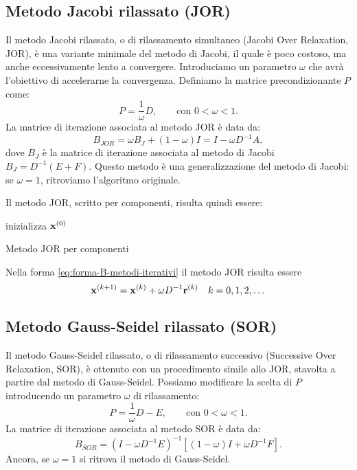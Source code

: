 \subsection{Metodo Jacobi rilassato (JOR)}
Il metodo Jacobi rilassato, o di rilassamento simultaneo (Jacobi Over Relaxation, JOR), è una variante minimale del metodo di Jacobi, il quale è poco costoso, ma anche eccessivamente lento a convergere.
Introduciamo un parametro $\omega$ che avrà l'obiettivo di accelerarne la convergenza. Definiamo la matrice precondizionante $P$ come:
\begin{equation*}
P=\frac{1}{\omega } D, \qquad \text{con } 0< \omega < 1.
\end{equation*}
La matrice di iterazione associata al metodo JOR è data da:
\begin{equation*}
B_{JOR} =\omega B_{J} +( 1-\omega ) I=I-\omega D^{-1} A,
\end{equation*}
dove %
$B_{J}$ è la matrice di iterazione associata al metodo di Jacobi $B_{J} =D^{-1}( E+F)$.
Questo metodo è una generalizzazione del metodo di Jacobi: se $\omega =1$, ritroviamo l'algoritmo originale.

Il metodo JOR, scritto per componenti, risulta quindi essere: \\
\begin{algo}
	inizializza $\mathbf{x}^{(0)}$\;
	\caption{Metodo JOR per componenti}
\end{algo}
Nella forma \eqref{eq:forma-B-metodi-iterativi} il metodo JOR risulta essere
\begin{equation*}
\mathbf{x}^{( k+1)} =\mathbf{x}^{(k)} +\omega D^{-1}\mathbf{r}^{(k)} \quad k=0,1,2,\dotsc
\end{equation*}
\subsection{Metodo Gauss-Seidel rilassato (SOR)}
Il metodo Gauss-Seidel rilassato, o di rilassamento successivo (Successive Over Relaxation, SOR), è ottenuto con un procedimento simile allo JOR, stavolta a partire dal metodo di Gauss-Seidel.
Possiamo modificare la scelta di $P$ introducendo un parametro $\omega$ di rilassamento:
\begin{equation*}
P=\frac{1}{\omega } D-E, \qquad \text{con } 0< \omega < 1.
\end{equation*}
La matrice di iterazione associata al metodo SOR è data da:
\begin{equation*}
B_{SOR} =\left( I-\omega D^{-1} E\right)^{-1}\left[( 1-\omega ) I+\omega D^{-1} F\right].
\end{equation*}
Ancora, se $\omega =1$ si ritrova il metodo di Gauss-Seidel.

